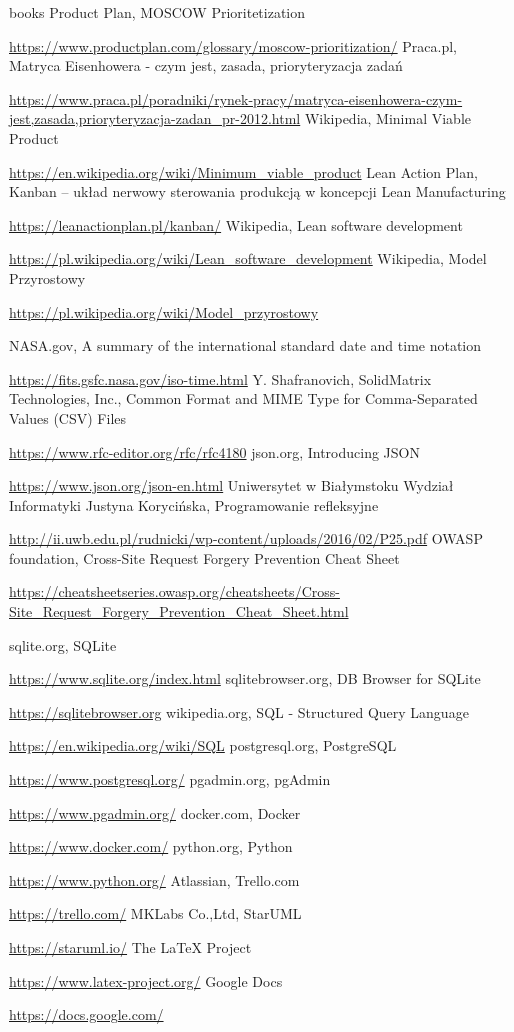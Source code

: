 \documentclass[a4paper, 10pt, twoside, openright]{report}
\begin{document}
\begin{large}
\begin{thebibliography} {books}
     Product Plan, MOSCOW Prioritetization \raggedright\url{
        https://www.productplan.com/glossary/moscow-prioritization/}
    Praca.pl, Matryca Eisenhowera - czym jest, zasada, prioryteryzacja zadań \raggedright\url{
        https://www.praca.pl/poradniki/rynek-pracy/matryca-eisenhowera-czym-jest,zasada,prioryteryzacja-zadan_pr-2012.html}
     Wikipedia, Minimal Viable Product \raggedright\url{
        https://en.wikipedia.org/wiki/Minimum_viable_product}
     Lean Action Plan, Kanban – układ nerwowy sterowania produkcją w koncepcji Lean Manufacturing \raggedright\url{
        https://leanactionplan.pl/kanban/}
     Wikipedia, Lean software development \raggedright\url{
        https://pl.wikipedia.org/wiki/Lean_software_development}
     Wikipedia, Model Przyrostowy \raggedright\url{
        https://pl.wikipedia.org/wiki/Model_przyrostowy}
    
     NASA.gov, A summary of the international standard date and time notation \raggedright\url{
        https://fits.gsfc.nasa.gov/iso-time.html}
     Y. Shafranovich, SolidMatrix Technologies, Inc., Common Format and MIME Type for Comma-Separated Values (CSV) Files \raggedright\url{
        https://www.rfc-editor.org/rfc/rfc4180}
     json.org, Introducing JSON \raggedright\url{
        https://www.json.org/json-en.html}
     Uniwersytet w Białymstoku Wydział Informatyki Justyna Korycińska, Programowanie refleksyjne \raggedright\url{
        http://ii.uwb.edu.pl/rudnicki/wp-content/uploads/2016/02/P25.pdf}
     OWASP foundation, Cross-Site Request Forgery Prevention Cheat Sheet \raggedright\url{
        https://cheatsheetseries.owasp.org/cheatsheets/Cross-Site_Request_Forgery_Prevention_Cheat_Sheet.html}
        
     sqlite.org, SQLite \raggedright\url{
        https://www.sqlite.org/index.html}
     sqlitebrowser.org, DB Browser for SQLite \raggedright\url{
        https://sqlitebrowser.org}
     wikipedia.org, SQL - Structured Query Language \raggedright\url{
        https://en.wikipedia.org/wiki/SQL}
     postgresql.org, PostgreSQL \raggedright\url{
        https://www.postgresql.org/}
     pgadmin.org, pgAdmin \raggedright\url{
        https://www.pgadmin.org/}
     docker.com, Docker \raggedright\url{
        https://www.docker.com/}
     python.org, Python \raggedright\url{
        https://www.python.org/}
     Atlassian, Trello.com \raggedright\url{
        https://trello.com/}
     MKLabs Co.,Ltd, StarUML \raggedright\url{
        https://staruml.io/}
     The LaTeX Project \raggedright\url{
        https://www.latex-project.org/}
     Google Docs \raggedright\url{
        https://docs.google.com/}
        

\end{thebibliography}
\end{large}
\end{document}
